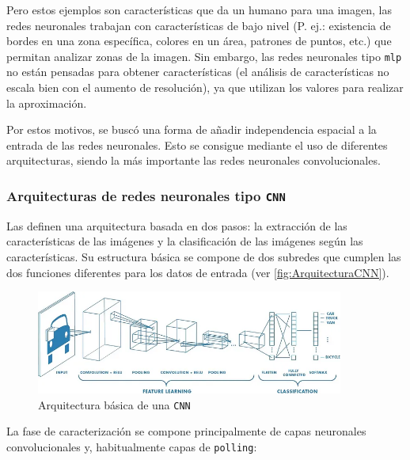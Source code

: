 Pero estos ejemplos son características que da un humano para una imagen, las redes neuronales trabajan con características de bajo nivel (P. ej.: existencia de bordes en una zona específica, colores en un área, 
patrones de puntos, etc.) que permitan analizar zonas de la imagen. Sin embargo, las redes neuronales tipo \texttt{\acrshort{mlp}} no están pensadas para obtener características (el análisis de características 
no escala bien con el aumento de resolución), ya que utilizan los valores para realizar la aproximación.

Por estos motivos, se buscó una forma de añadir independencia espacial a la entrada de las redes neuronales. Esto se consigue mediante el uso de diferentes arquitecturas, siendo la más importante las redes 
neuronales convolucionales.\newline

\subsubsection{Arquitecturas de redes neuronales tipo \texttt{CNN}}

Las \texttt{} definen una arquitectura basada en dos pasos: la extracción de las características de las imágenes y la clasificación de las imágenes según las características. Su estructura básica se compone de dos subredes 
que cumplen las dos funciones diferentes para los datos de entrada (ver \autoref{fig:ArquitecturaCNN}).

\begin{figure}[H]
    \centering
    \includegraphics[width=0.9\textwidth]{images/4/ArquitecturaCNN.png}
    \caption{Arquitectura básica de una \texttt{CNN}\cite{sahaComprehensiveGuideConvolutional2022}}
    \label{fig:ArquitecturaCNN}
\end{figure}

\clearpage

La fase de caracterización se compone principalmente de capas neuronales convolucionales y, habitualmente capas de \texttt{polling}:

